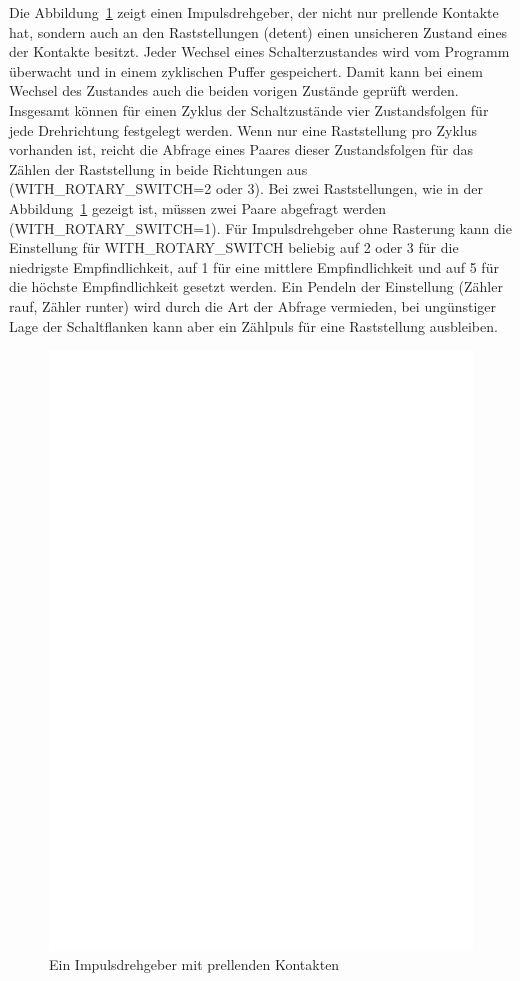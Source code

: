 Die Abbildung~\ref{fig:RotBounce} zeigt einen Impulsdrehgeber, der nicht nur
prellende Kontakte hat, sondern auch an den Raststellungen (detent) einen unsicheren Zustand
eines der Kontakte besitzt. Jeder Wechsel eines Schalterzustandes wird vom Programm 
überwacht und in einem zyklischen Puffer gespeichert. Damit kann bei einem Wechsel des
Zustandes auch die beiden vorigen Zustände geprüft werden.
Insgesamt können für einen Zyklus der Schaltzustände vier Zustandsfolgen für jede Drehrichtung
festgelegt werden. Wenn nur eine Raststellung pro Zyklus vorhanden ist, reicht die Abfrage eines
Paares dieser Zustandsfolgen für das Zählen der Raststellung in beide Richtungen aus (WITH\_ROTARY\_SWITCH=2 oder 3).
Bei zwei Raststellungen, wie in der Abbildung~\ref{fig:RotBounce} gezeigt ist,
müssen zwei Paare abgefragt werden (WITH\_ROTARY\_SWITCH=1).
Für Impulsdrehgeber ohne Rasterung kann die Einstellung für WITH\_ROTARY\_SWITCH beliebig auf
2 oder 3 für die niedrigste Empfindlichkeit, auf 1 für eine mittlere Empfindlichkeit und auf 5 für
die höchste Empfindlichkeit gesetzt werden. 
Ein Pendeln der Einstellung (Zähler rauf, Zähler runter) wird durch die Art der Abfrage vermieden, bei
ungünstiger Lage der Schaltflanken kann aber ein Zählpuls für eine Raststellung ausbleiben.

\begin{figure}[H]
\centering
\includegraphics[width=14cm]{../FIG/rotary_bouncing.eps}
\caption{Ein Impulsdrehgeber mit prellenden Kontakten}
\label{fig:RotBounce}
\end{figure}

